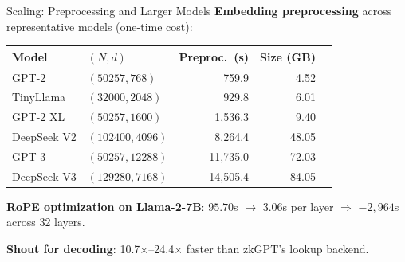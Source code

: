 \documentclass[aspectratio=169,10pt]{beamer}
\newcommand{\pos}[1]{\textcolor{positive}{#1}}
\begin{document}
\begin{frame}{Scaling: Preprocessing and Larger Models}
\textbf{Embedding preprocessing} across representative models (one-time cost):

\vspace{4pt}
\begin{center}
\begin{tabular}{@{}llrrr@{}}
\toprule
Model & $(N, d)$ & Preproc.\ (s) & Size (GB) \\
\midrule
GPT-2 & $(50257, 768)$ & 759.9 & 4.52 \\
TinyLlama & $(32000, 2048)$ & 929.8 & 6.01 \\
GPT-2 XL & $(50257, 1600)$ & 1,536.3 & 9.40 \\
DeepSeek V2 & $(102400, 4096)$ & 8,264.4 & 48.05 \\
GPT-3 & $(50257, 12288)$ & 11,735.0 & 72.03 \\
DeepSeek V3 & $(129280, 7168)$ & 14,505.4 & 84.05 \\
\bottomrule
\end{tabular}
\end{center}

\vspace{4pt}
\textbf{RoPE optimization on Llama-2-7B}: $95.70$s $\to$ $3.06$s per layer $\Rightarrow$ \pos{$-2{,}964$s} across 32 layers.

\vspace{2pt}
\textbf{Shout for decoding}: \pos{10.7$\times$--24.4$\times$} faster than zkGPT's lookup backend.
\end{frame}

\end{document}
